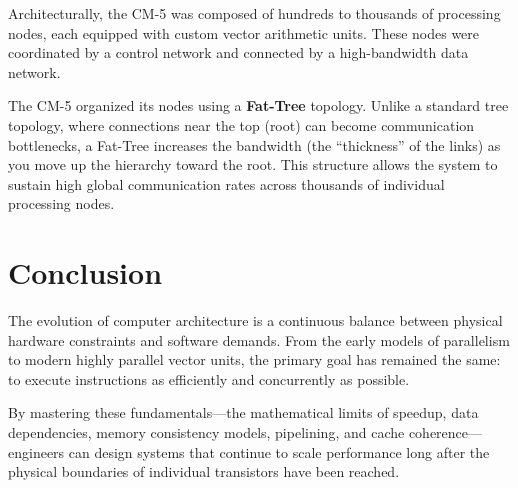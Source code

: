 \documentclass[12pt,a4paper,openany]{book}
\begin{document}
Architecturally, the CM-5 was composed of hundreds to thousands of processing nodes, each equipped with custom vector arithmetic units. These nodes were coordinated by a control network and connected by a high-bandwidth data network.

The CM-5 organized its nodes using a \textbf{Fat-Tree} topology. Unlike a standard tree topology, where connections near the top (root) can become communication bottlenecks, a Fat-Tree increases the bandwidth (the ``thickness'' of the links) as you move up the hierarchy toward the root. This structure allows the system to sustain high global communication rates across thousands of individual processing nodes.

\chapter*{Conclusion}

The evolution of computer architecture is a continuous balance between physical hardware constraints and software demands. From the early models of parallelism to modern highly parallel vector units, the primary goal has remained the same: to execute instructions as efficiently and concurrently as possible.

By mastering these fundamentals—the mathematical limits of speedup, data dependencies, memory consistency models, pipelining, and cache coherence—engineers can design systems that continue to scale performance long after the physical boundaries of individual transistors have been reached.
\end{document}
